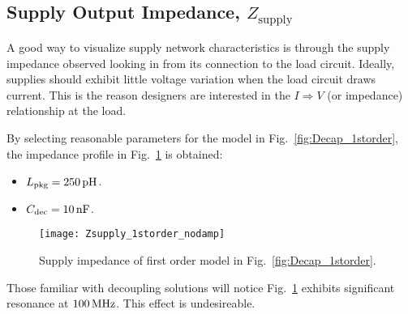 \subsection{Supply Output Impedance, $Z_\mathrm{supply}$}
\par A good way to visualize supply network characteristics is through the
supply impedance observed looking in from its connection to the load circuit.
Ideally, supplies should exhibit little voltage variation when the load
circuit draws current. This is the reason designers are interested in the
$I{\Rightarrow}V$ (or impedance) relationship at the load.
%
\par\noindent By selecting reasonable parameters for the model in
Fig.~\ref{fig:Decap_1storder}, the impedance profile in
Fig.~\ref{fig:Zsupply_1storder_nodamp} is obtained:
%
\begin{itemize}[noitemsep]
\item $L_\mathrm{pkg}=250\mathrm{\,pH}$.
\item $C_\mathrm{dec}=10\mathrm{\,nF}$.
\end{itemize}
%
\begin{figure}[!ht]
	\centering
	\texttt{[image: Zsupply\_1storder\_nodamp]}
	\caption{Supply impedance of first order model in Fig.~\ref{fig:Decap_1storder}.}
\label{fig:Zsupply_1storder_nodamp}%
\end{figure}
%
\par Those familiar with decoupling solutions will notice
Fig.~\ref{fig:Zsupply_1storder_nodamp} exhibits significant resonance at
$100\mathrm{\,MHz}$. This effect is undesireable.
%
